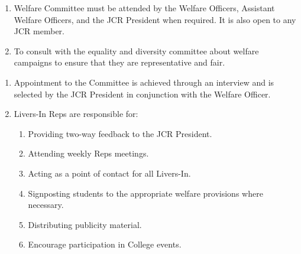 
\begin{enumerate}
    \item Welfare Committee must be attended by the Welfare Officers, Assistant Welfare Officers, and the JCR President when required. It is also open to any JCR member.
    \item To consult with the equality and diversity committee about welfare campaigns to ensure that they are representative and fair.
\end{enumerate}


\begin{enumerate}
    \item Appointment to the Committee is achieved through an interview and is selected by the JCR President in conjunction with the Welfare Officer.
    \item Livers-In Reps are responsible for:
    \begin{enumerate}
        \item Providing two-way feedback to the JCR President.
        \item Attending weekly Reps meetings.
        \item Acting as a point of contact for all Livers-In.
        \item Signposting students to the appropriate welfare provisions where necessary. 
        \item Distributing publicity material.
        \item Encourage participation in College events.
    \end{enumerate}
\end{enumerate}



